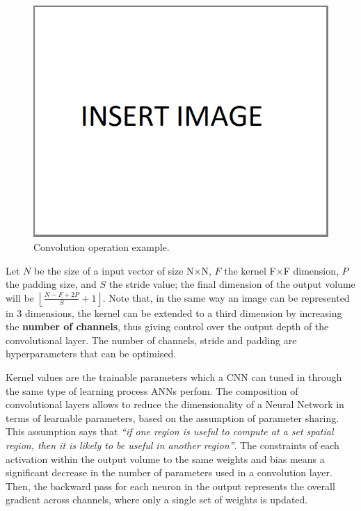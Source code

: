 \begin{figure}[!h]
    \centering
    \includegraphics[scale=.45]{imagenes/insertImage.png}
    \caption{Convolution operation example.}
    \label{fig:convolutionPoolingExample}
\end{figure}

Let $N$ be the size of a input vector of size N$\times$N, $F$ the kernel F$\times$F dimension, 
$P$ the padding size, and $S$ the stride value; the final dimension of the output volume will 
be $\left\lfloor \frac{N - F + 2P}{S} + 1 \right\rfloor$. Note that, in the same way an image can be 
represented in 3 dimensions, the kernel can be extended to a third dimension by increasing 
the \textbf{number of channels}, thus giving control over the output depth of the 
convolutional layer. The number of channels, stride and padding are hyperparameters that can 
be optimised. 

Kernel values are the trainable parameters which a CNN can tuned in through the same type 
of learning process ANNs perfom. The composition of convolutional layers allows to reduce the 
dimensionality of a Neural Network in terms of learnable parameters, based on the assumption 
of parameter sharing. This assumption says that \textit{“if one region is useful to compute at 
a set spatial region, then it is likely to be useful in another region”}. The constraints of 
each activation within the output volume to the same weights and bias means a significant 
decrease in the number of parameters used in a convolution layer. Then, the backward pass for 
each neuron in the output represents the overall gradient across channels, where only a 
single set of weights is updated.

